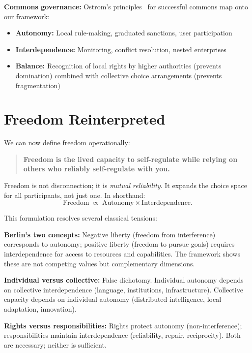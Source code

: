 \documentclass[11pt,a4paper]{article}
\begin{document}
\textbf{Commons governance:} Ostrom's principles~\cite{ostrom} for successful commons map onto our framework:
\begin{itemize}
    \item \textbf{Autonomy:} Local rule-making, graduated sanctions, user participation
    \item \textbf{Interdependence:} Monitoring, conflict resolution, nested enterprises
    \item \textbf{Balance:} Recognition of local rights by higher authorities (prevents domination) combined with collective choice arrangements (prevents fragmentation)
\end{itemize}

\section{Freedom Reinterpreted}

We can now define freedom operationally:
\begin{quote}
\textbf{Freedom is the lived capacity to self-regulate while relying on others who reliably self-regulate with you.}
\end{quote}

Freedom is not disconnection; it is \emph{mutual reliability}.
It expands the choice space for all participants, not just one.
In shorthand:
\begin{equation}
  \text{Freedom} \;\propto\; \text{Autonomy} \times \text{Interdependence}.
  \label{eq:freedom-product}
\end{equation}

This formulation resolves several classical tensions:

\textbf{Berlin's two concepts:} Negative liberty (freedom from interference) corresponds to autonomy; positive liberty (freedom to pursue goals) requires interdependence for access to resources and capabilities. The framework shows these are not competing values but complementary dimensions.

\textbf{Individual versus collective:} False dichotomy. Individual autonomy depends on collective interdependence (language, institutions, infrastructure). Collective capacity depends on individual autonomy (distributed intelligence, local adaptation, innovation).

\textbf{Rights versus responsibilities:} Rights protect autonomy (non-interference); responsibilities maintain interdependence (reliability, repair, reciprocity). Both are necessary; neither is sufficient.
\end{document}
